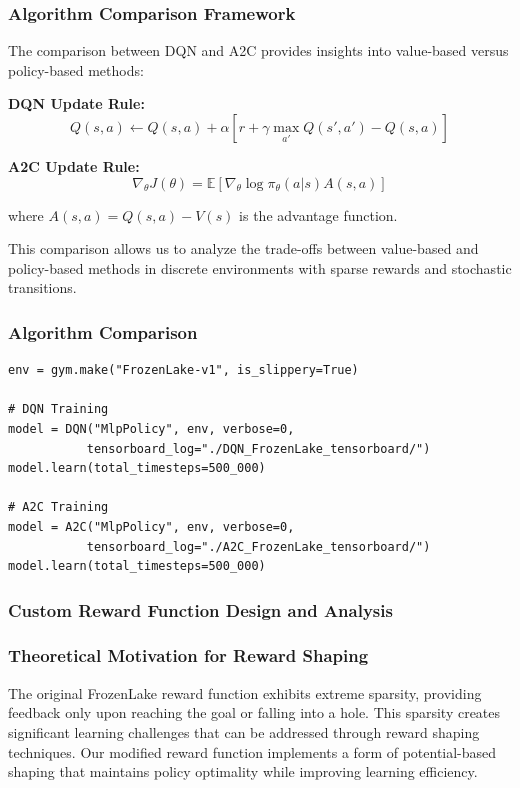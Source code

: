 \documentclass[12pt]{article}
\begin{document}
{{{\subsubsection{Algorithm Comparison Framework}

The comparison between DQN and A2C provides insights into value-based versus policy-based methods:

\textbf{DQN Update Rule:}
\begin{equation}
Q(s,a) \leftarrow Q(s,a) + \alpha \left[r + \gamma \max_{a'} Q(s',a') - Q(s,a)\right]
\end{equation}

\textbf{A2C Update Rule:}
\begin{equation}
\nabla_\theta J(\theta) = \mathbb{E}\left[\nabla_\theta \log \pi_\theta(a|s) A(s,a)\right]
\end{equation}

where $A(s,a) = Q(s,a) - V(s)$ is the advantage function.

This comparison allows us to analyze the trade-offs between value-based and policy-based methods in discrete environments with sparse rewards and stochastic transitions.

\subsubsection{Algorithm Comparison}

\begin{verbatim}
env = gym.make("FrozenLake-v1", is_slippery=True)

# DQN Training
model = DQN("MlpPolicy", env, verbose=0, 
           tensorboard_log="./DQN_FrozenLake_tensorboard/")
model.learn(total_timesteps=500_000)

# A2C Training  
model = A2C("MlpPolicy", env, verbose=0, 
           tensorboard_log="./A2C_FrozenLake_tensorboard/")
model.learn(total_timesteps=500_000)
\end{verbatim}

\subsubsection{Custom Reward Function Design and Analysis}

\subsubsection{Theoretical Motivation for Reward Shaping}

The original FrozenLake reward function exhibits extreme sparsity, providing feedback only upon reaching the goal or falling into a hole. This sparsity creates significant learning challenges that can be addressed through reward shaping techniques. Our modified reward function implements a form of potential-based shaping that maintains policy optimality while improving learning efficiency.

}}}
\end{document}
